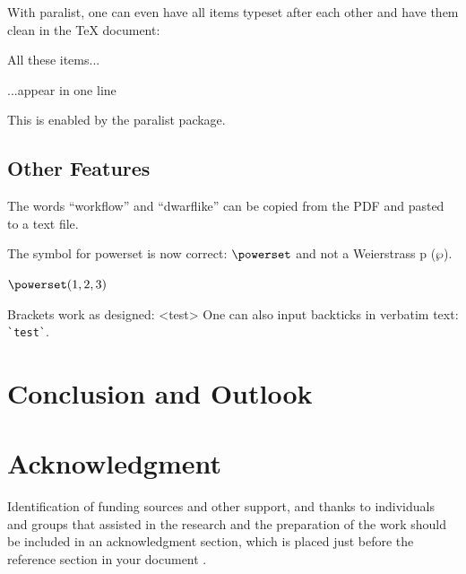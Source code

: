 With paralist, one can even have all items typeset after each other and have them clean in the TeX document:

\begin{ltgexample}
\begin{inparaenum}
  \item All these items...
  \item ...appear in one line
  \item This is enabled by the paralist package.
\end{inparaenum}
\end{ltgexample}

\subsection{Other Features}

\begin{ltgexample}
The words \enquote{workflow} and \enquote{dwarflike} can be copied from the PDF and pasted to a text file.
\end{ltgexample}

\begin{ltgexample}
The symbol for powerset is now correct: $\powerset$ and not a Weierstrass p ($\wp$).

$\powerset({1,2,3})$
\end{ltgexample}

\begin{ltgexample}
Brackets work as designed:
<test>
One can also input backticks in verbatim text: \verb|`test`|.
\end{ltgexample}


\section{Conclusion and Outlook}
\label{sec:outlook}
\lipsum[1-2]

\section*{Acknowledgment}

Identification of funding sources and other support, and thanks to individuals and groups that assisted in the research and the preparation of the work should be included in an acknowledgment section, which is placed just before the reference section in your document \cite{acmart}.


